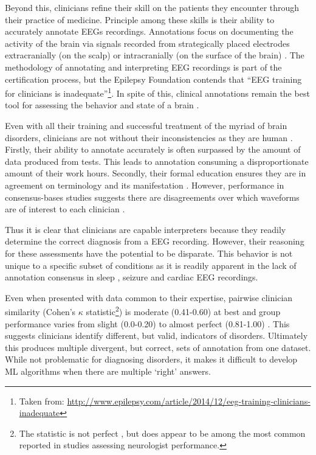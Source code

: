 Beyond this, clinicians refine their skill on the patients they encounter through their practice of medicine. Principle among these skills is their ability to accurately annotate \acp{EEG} recordings. Annotations focus on documenting the activity of the brain via signals recorded from strategically placed electrodes extracranially (on the scalp) or intracranially (on the surface of the brain) \cite{Epstein2006}. The methodology of annotating and interpreting \ac{EEG} recordings is part of the certification process, but the Epilepsy Foundation contends that ``EEG training for clinicians is inadequate''\footnote{Taken from: \url{http://www.epilepsy.com/article/2014/12/eeg-training-clinicians-inadequate}}. In spite of this, clinical annotations remain the best tool for assessing the behavior and state of a brain \cite{Banaschewski2007}. 

Even with all their training and successful treatment of the myriad of brain disorders, clinicians are not without their inconsistencies as they are human \cite{Grant2014}. Firstly, their ability to annotate accurately is often surpassed by the amount of data produced from tests. This leads to annotation consuming a disproportionate amount of their work hours. Secondly, their formal education ensures they are in agreement on terminology and its manifestation \cite{Gaspard2014}. However, performance in consensus-bases studies suggests there are disagreements over which waveforms are of interest to each clinician \cite{Grant2014,Halford2015,Warby2014}.

Thus it is clear that clinicians are capable interpreters because they readily determine the correct diagnosis from a \ac{EEG} recording. However, their reasoning for these assessments have the potential to be disparate. This behavior is not unique to a specific subset of conditions as it is readily apparent in the lack of annotation consensus in sleep \cite{Warby2014}, seizure \cite{Grant2014} and cardiac \cite{Westhall2015} \ac{EEG} recordings.

Even when presented with data common to their expertise, pairwise clinician similarity (Cohen's $\kappa$ statistic\footnote{The statistic is not perfect \cite{Gwet2002}, but does appear to be among the most common reported in studies assessing neurologist performance.}) is moderate (0.41-0.60) at best \cite{Grant2014} and group performance varies from slight (0.0-0.20) to almost perfect (0.81-1.00) \cite{Westhall2015}. This suggests clinicians identify different, but valid, indicators of disorders. Ultimately this produces multiple divergent, but correct, sets of annotation from one dataset. While not problematic for diagnosing disorders, it makes it difficult to develop \ac{ML} algorithms when there are multiple `right' answers.

